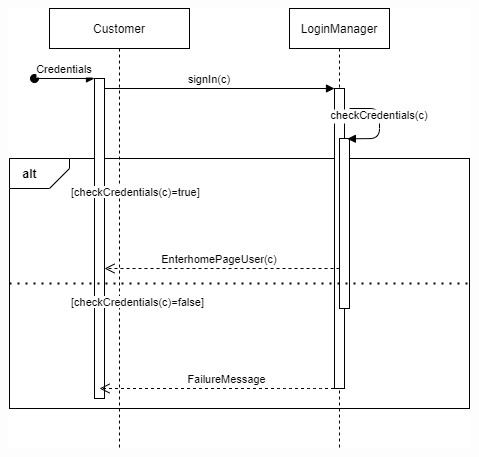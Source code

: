 \documentclass[a4paper, 10pt, oneside]{article}
\begin{document}
\begin{minipage}{\linewidth}
            \centering
           \includegraphics[height=0.5\textheight, scale=1, keepaspectratio]{img/seq_diag/Login.jpg}
\end{minipage}
\end{document}
